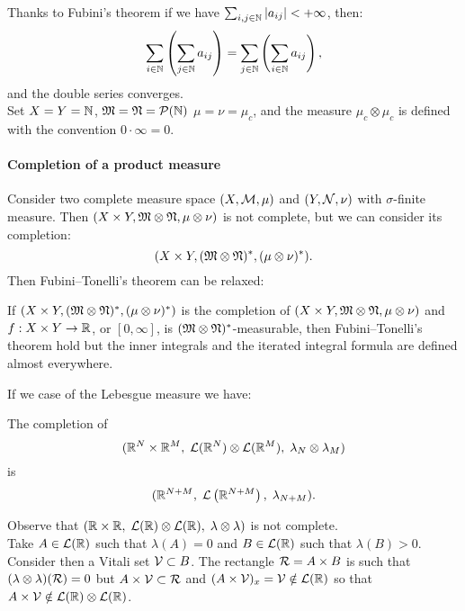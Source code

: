 Thanks to Fubini's theorem if we have $\sum_{i,j \in \mathbb N}|a_{ij}| < +\infty$, then:
$$\sum_{i \in \mathbb N} \left(\sum_{j \in \mathbb N} a_{ij}\right) =\sum_{j \in \mathbb N} \left(\sum_{i \in \mathbb N} a_{ij}\right),$$
and the double series converges.\\
Set $X=Y=\mathbb N$, $\mathfrak M = \mathfrak N = \mathcal P(\mathbb N)$ $\mu= \nu= \mu_c$, and the measure $\mu_c \otimes \mu_c$ is defined with the convention $0 \cdot \infty = 0$.
	
\paragraph{Completion of a product measure} Consider two complete measure space $(X, \mathcal M, \mu)$ and $(Y, \mathcal N, \nu)$ with $\sigma$-finite measure. Then $(X\times Y, \mathfrak M \otimes \mathfrak N, \mu \otimes \nu)$ is not complete, but we can consider its completion:
$$(X\times Y, (\mathfrak M \otimes \mathfrak N)^*, (\mu \otimes \nu)^*).$$
Then Fubini--Tonelli's theorem can be relaxed:

\begin{theo}
	If $(X\times Y, (\mathfrak M \otimes \mathfrak N)^*, (\mu \otimes \nu)^*)$ is the completion of $(X\times Y, \mathfrak M \otimes \mathfrak N, \mu \otimes \nu)$ and $f: X \times Y \to \mathbb R$, or $[0, \infty]$, is $(\mathfrak M \otimes \mathfrak N)^*$-measurable, then Fubini--Tonelli's theorem hold but the inner integrals and the iterated integral formula are defined almost everywhere.
\end{theo}

If we case of the Lebesgue measure we have:
\begin{prop}
	The completion of
	$$(\mathbb R^N \times \mathbb R^M, \; \mathcal L(\mathbb R^N) \otimes \mathcal L(\mathbb R^M),\; \lambda_N \otimes \lambda_M)$$
	is
	$$(\mathbb R^{N+M}, \; \mathcal L \left( \mathbb R^{N+M} \right), \; \lambda_{N+M}).$$
\end{prop}

Observe that $(\mathbb R \times \mathbb R, \; \mathcal L(\mathbb R) \otimes \mathcal L(\mathbb R),\; \lambda \otimes \lambda)$ is not complete.\\
Take $A \in \mathcal L(\mathbb R)$ such that $\lambda(A)=0$ and $B \in \mathcal L(\mathbb R)$ such that $\lambda(B)>0$.\\
Consider then a Vitali set $\mathcal V \subset B$. The rectangle $\mathcal R = A \times B$ is such that $(\lambda \otimes \lambda)(\mathcal R)=0$ but $A \times \mathcal V \subset \mathcal R$ and $(A \times \mathcal V)_x = \mathcal V \notin \mathcal L(\mathbb R)$ so that $A \times \mathcal V \notin \mathcal L(\mathbb R) \otimes \mathcal L(\mathbb R)$. 

